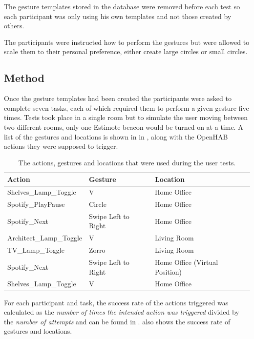 The gesture templates stored in the database were removed before each test so each participant was only using his own templates and not those created by others.

The participants were instructed how to perform the gestures but were allowed to scale them to their personal preference, \eg either create large circles or small circles.

\subsection{Method}

Once the gesture templates had been created the participants were asked to complete seven tasks, each of which required them to perform a given gesture five times.
Tests took place in a single room but to simulate the user moving between two different rooms, only one Estimote beacon would be turned on at a time.
A list of the gestures and locations is shown in in , along with the OpenHAB actions they were supposed to trigger.

\begin{table}[h]
\centering
\begin{tabular}{|l|l|l|}
\hline
\textbf{Action}         & \textbf{Gesture}    & \textbf{Location}              \\ \hline
Shelves\_Lamp\_Toggle   & V                   & Home Office                    \\ \hline
Spotify\_PlayPause      & Circle              & Home Office                    \\ \hline
Spotify\_Next           & Swipe Left to Right & Home Office                    \\ \hline
Architect\_Lamp\_Toggle & V                   & Living Room                    \\ \hline
TV\_Lamp\_Toggle        & Zorro               & Living Room                    \\ \hline
Spotify\_Next           & Swipe Left to Right & Home Office (Virtual Position) \\ \hline
Shelves\_Lamp\_Toggle   & V                   & Home Office                    \\ \hline
\end{tabular}
\caption{The actions, gestures and locations that were used during the user tests.}
\label{table:user-test-tasks}
\end{table}

For each participant and task, the success rate of the actions triggered was calculated as the \emph{number of times the intended action was triggered} divided by the \emph{number of attempts} and can be found in .  also shows the success rate of gestures and locations.

